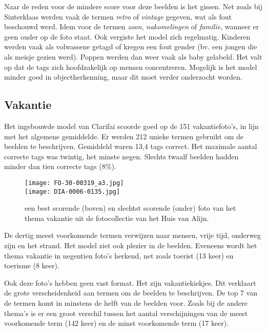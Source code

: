 Naar de reden voor de mindere score voor deze beelden is het gissen. Net zoals bij Sinterklaas werden vaak de termen \textit{retro} of \textit{vintage} gegeven, wat als fout beschouwd werd. Idem voor de termen \textit{zoon}, \textit{nakomelingen} of \textit{familie}, wanneer er geen ouder op de foto staat. Ook vergiste het model zich regelmatig. Kinderen werden vaak als volwassene getagd of kregen een fout gender (bv. een jongen die als meisje gezien werd). Poppen werden dan weer vaak als baby gelabeld. Het valt op dat de tags zich hoofdzakelijk op mensen concentreren. Mogelijk is het model minder goed in objectherkenning, maar dit moet verder onderzocht worden.

\subsection{Vakantie}

Het ingebouwde model van Clarifai scoorde goed op de 151 vakantiefoto’s, in lijn met het algemene gemiddelde.  Er werden 212 unieke termen gebruikt om de beelden te beschrijven. Gemiddeld waren 13,4 tags correct. Het maximale aantal correcte tags was twintig, het minste negen. Slechts twaalf beelden hadden minder dan tien correcte tags (8\%).

\begin{figure}
	\centering
	\texttt{[image: FO-30-00319\_a3.jpg]}\hfill
	\\[\smallskipamount]
	\texttt{[image: DIA-0006-0135.jpg]}\hfill
	\caption[Best en slechtst scorende foto van thema vakantie]{een best scorende (boven) en slechtst scorende (onder) foto van het thema vakantie uit de fotocollectie van het Huis van Alijn.}
\end{figure}

De dertig meest voorkomende termen verwijzen naar mensen, vrije tijd, onderweg zijn en het strand. Het model ziet ook plezier in de beelden. Eveneens wordt het thema vakantie in negentien foto’s herkend, net zoals toerist (13 keer) en toerisme (8 keer).

Ook deze foto’s hebben geen vast format. Het zijn vakantiekiekjes. Dit verklaart de grote verscheidenheid aan termen om de beelden te beschrijven. De top 7 van de termen komt in minstens de helft van de beelden voor. Zoals bij de andere thema’s is er een groot verschil tussen het aantal verschijningen van de meest voorkomende term (142 keer) en de minst voorkomende term (17 keer). 

